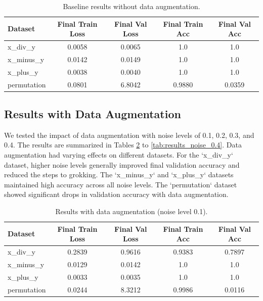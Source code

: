 \documentclass{article} %
\begin{document}
\begin{table}[h]
    \centering
    \begin{tabular}{lcccc}
        \toprule
        Dataset & Final Train Loss & Final Val Loss & Final Train Acc & Final Val Acc \\
        \midrule
        x\_div\_y & 0.0058 & 0.0065 & 1.0 & 1.0 \\
        x\_minus\_y & 0.0142 & 0.0149 & 1.0 & 1.0 \\
        x\_plus\_y & 0.0038 & 0.0040 & 1.0 & 1.0 \\
        permutation & 0.0801 & 6.8042 & 0.9880 & 0.0359 \\
        \bottomrule
    \end{tabular}
    \caption{Baseline results without data augmentation.}
    \label{tab:baseline_results}
\end{table}

\subsection{Results with Data Augmentation}
We tested the impact of data augmentation with noise levels of 0.1, 0.2, 0.3, and 0.4. The results are summarized in Tables \ref{tab:results_noise_0.1} to \ref{tab:results_noise_0.4}. Data augmentation had varying effects on different datasets. For the `x\_div\_y` dataset, higher noise levels generally improved final validation accuracy and reduced the steps to grokking. The `x\_minus\_y` and `x\_plus\_y` datasets maintained high accuracy across all noise levels. The `permutation` dataset showed significant drops in validation accuracy with data augmentation.

\begin{table}[h]
    \centering
    \begin{tabular}{lcccc}
        \toprule
        Dataset & Final Train Loss & Final Val Loss & Final Train Acc & Final Val Acc \\
        \midrule
        x\_div\_y & 0.2839 & 0.9616 & 0.9383 & 0.7897 \\
        x\_minus\_y & 0.0129 & 0.0142 & 1.0 & 1.0 \\
        x\_plus\_y & 0.0033 & 0.0035 & 1.0 & 1.0 \\
        permutation & 0.0244 & 8.3212 & 0.9986 & 0.0116 \\
        \bottomrule
    \end{tabular}
    \caption{Results with data augmentation (noise level 0.1).}
    \label{tab:results_noise_0.1}
\end{table}
\end{document}

